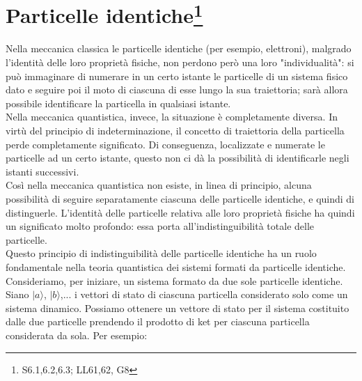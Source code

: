 \documentclass[a4paper,12pt,oneside]{book}
\newcommand*{\myfont}{\fontfamily{ppl}\selectfont}
\begin{document}
\fancypagestyle{plain}{%
\fancyhf{} %
\fancyfoot[C]{\bfseries \myfont{\thepage}} %
\renewcommand{\headrulewidth}{0pt}
\renewcommand{\footrulewidth}{0pt}}

\fancypagestyle{VS}{
\headheight = 15pt
\lhead[\myfont{\textit{\textbf{\thechapter\nouppercase{\leftmark}}}}]{\myfont{\textit{\textbf{\nouppercase{\leftmark}}}}}
\chead[]{}
\rhead[\myfont{\textbf{\thepage}}]{\myfont{\textbf{\thepage}}}

\lfoot[]{}
\cfoot[]{}
\rfoot[]{}
}



\pagestyle{VS}
\setcounter{chapter}{19}
\setcounter{page}{199}
\chapter[Particelle identiche]{Particelle identiche\footnote{S6.1,6.2,6.3; LL61,62, G8}}
Nella meccanica classica le particelle identiche (per esempio, elettroni), malgrado l'identità delle loro proprietà fisiche, non perdono però una loro "individualità": si può immaginare di numerare in un certo istante le particelle di un sistema fisico dato e seguire poi il moto di ciascuna di esse lungo la sua traiettoria; sarà allora possibile identificare la particella in qualsiasi istante.\\ 
Nella meccanica quantistica, invece, la situazione \`e completamente diversa. In virtù del principio di indeterminazione, il concetto di traiettoria della particella perde completamente significato. Di conseguenza, localizzate e numerate le particelle ad un certo istante, questo non ci dà la possibilità di identificarle negli istanti successivi.\\
Cos\`i nella meccanica quantistica non esiste, in linea di principio, alcuna possibilità di seguire separatamente ciascuna delle particelle identiche, e quindi di distinguerle. L'identità delle particelle relativa alle loro proprietà fisiche ha quindi un significato molto profondo: essa porta all'indistinguibilità totale delle particelle.\\
Questo principio di indistinguibilità delle particelle identiche ha un ruolo fondamentale nella teoria quantistica dei sistemi formati da particelle identiche.\\
Consideriamo, per iniziare, un sistema formato da due sole particelle identiche. Siano $|a\rangle$, $|b\rangle$,... i vettori di stato di ciascuna particella considerato solo come un sistema dinamico. Possiamo ottenere un vettore di stato per il sistema costituito dalle due particelle prendendo il prodotto di ket per ciascuna particella considerata da sola. Per esempio:
\end{document}
